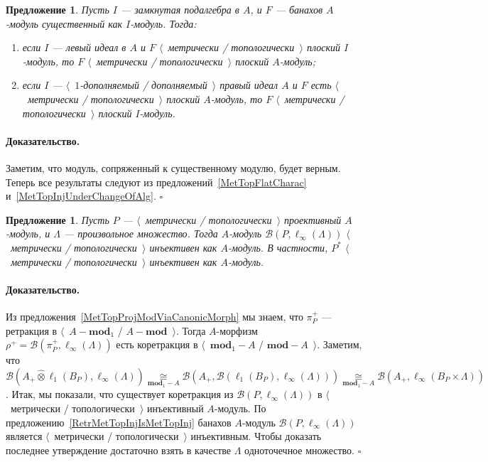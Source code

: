 \documentclass[12pt]{article}
\newcommand{\projtens}{\mathbin{\widehat{\otimes}}}
\newcommand{\isom}[1]{\mathop{\mathbin{\cong}}\limits_{#1}}
\newtheorem{proposition}[theorem]{Предложение}
\renewenvironment{proof}{\paragraph{Доказательство.}}{\hfill$\square$\medskip}
\begin{document}
\begin{proposition}\label{MetTopFlatUnderChangeOfAlg} Пусть $I$ --- замкнутая
    подалгебра в $A$, и $F$ --- банахов $A$-модуль существенный как $I$-модуль.
    Тогда:
    \begin{enumerate}[label = (\roman*)]
        \item если $I$ --- левый идеал в $A$ и $F$ $\langle$~метрически /
              топологически~$\rangle$ плоский $I$-модуль, то $F$ $\langle$~метрически /
              топологически~$\rangle$ плоский $A$-модуль;

        \item если $I$ --- $\langle$~$1$-дополняемый / дополняемый~$\rangle$ правый
              идеал $A$ и $F$ есть $\langle$~метрически / топологически~$\rangle$ плоский
              $A$-модуль, то $F$ $\langle$~метрически / топологически~$\rangle$ плоский
              $I$-модуль.
    \end{enumerate}

\end{proposition}
\begin{proof} Заметим, что модуль, сопряженный к существенному модулю, будет
    верным. Теперь все результаты следуют из предложений~\ref{MetTopFlatCharac}
    и~\ref{MetTopInjUnderChangeOfAlg}.
\end{proof}

\begin{proposition}\label{DualMetTopProjIsMetrInj} Пусть $P$ ---
    $\langle$~метрически / топологически~$\rangle$ проективный $A$-модуль, и
    $\Lambda$ --- произвольное множество. Тогда $A$-модуль
    $\mathcal{B}(P,\ell_\infty(\Lambda))$ $\langle$~метрически /
    топологически~$\rangle$ инъективен как $A$-модуль. В частности, $P^*$
    $\langle$~метрически / топологически~$\rangle$ инъективен как $A$-модуль.
\end{proposition}
\begin{proof} Из предложения~\ref{MetTopProjModViaCanonicMorph} мы знаем, что
    $\pi_P^+$ --- ретракция в $\langle$~$A-\mathbf{mod}_1$ /
    $A-\mathbf{mod}$~$\rangle$. Тогда $A$-морфизм
    $\rho^+=\mathcal{B}(\pi_P^+,\ell_\infty(\Lambda))$ есть коретракция в
    $\langle$~$\mathbf{mod}_1-A$ / $\mathbf{mod}-A$~$\rangle$. Заметим, что
    $\mathcal{B}(A_+\projtens\ell_1(B_P),\ell_\infty(\Lambda))
        \isom{\mathbf{mod}_1-A}
        \mathcal{B}(A_+,\mathcal{B}(\ell_1(B_P),\ell_\infty(\Lambda)))
        \isom{\mathbf{mod}_1-A}\mathcal{B}(A_+,\ell_\infty(B_P\times\Lambda))$.
    Итак, мы показали, что существует коретракция из
    $\mathcal{B}(P,\ell_\infty(\Lambda))$ в $\langle$~метрически /
    топологически~$\rangle$ инъективный $A$-модуль. По
    предложению~\ref{RetrMetTopInjIsMetTopInj} банахов $A$-модуль
    $\mathcal{B}(P,\ell_\infty(\Lambda))$ является $\langle$~метрически /
    топологически~$\rangle$ инъективным. Чтобы доказать последнее утверждение
    достаточно взять в качестве $\Lambda$ одноточечное множество.
\end{proof}
\end{document}
